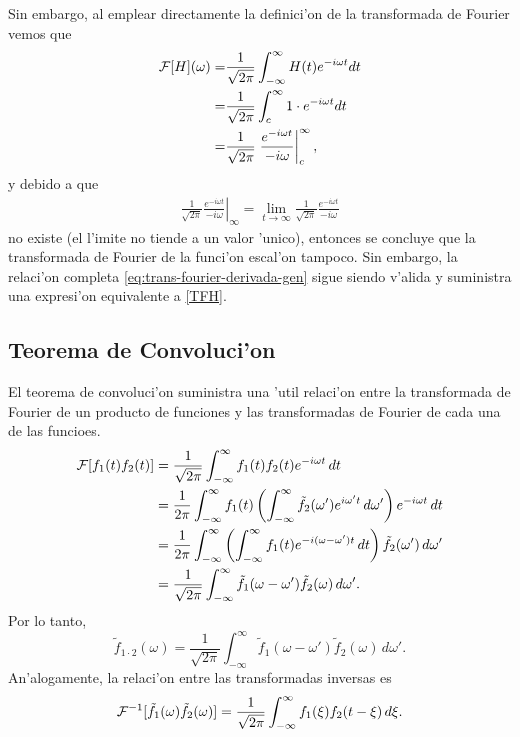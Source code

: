 Sin embargo, al emplear directamente la definici'on de la transformada de Fourier vemos que
\begin{align}
{\cal F}[H](\omega)=&\frac{1}{\sqrt{2\pi}}\int_{-\infty}^{\infty}H(t)e^{-i\omega t}dt\notag \\
=&\frac{1}{\sqrt{2\pi}}\int_{c}^{\infty}1\cdot e^{-i\omega t}dt\notag \\
=&\frac{1}{\sqrt{2\pi}}\left.\frac{e^{-i\omega t}}{-i\omega}\right|_{c}^{\infty}, \label{TFH}
\end{align}
y debido a que
\begin{align}
\frac{1}{\sqrt{2\pi}}\left.\frac{e^{-i\omega t}}{-i\omega}\right|_{\infty}=\lim_{t \rightarrow \infty} \frac{1}{\sqrt{2\pi}}\frac{e^{-i\omega t}}{-i\omega}
\end{align}
no existe (el l'imite no tiende a un valor 'unico), entonces se concluye que la transformada de Fourier de la funci'on escal'on tampoco. Sin embargo, la relaci'on  completa \eqref{eq:trans-fourier-derivada-gen} sigue siendo v'alida y suministra una expresi'on equivalente a \eqref{TFH}.
%
\subsection{Teorema de Convoluci'on}
El teorema de convoluci'on suministra una 'util relaci'on entre la transformada de Fourier de un producto de funciones y las transformadas de Fourier de cada una de las funcioes.
\begin{align}
{\cal F}[f_1(t)f_2(t)]
 &=\frac{1}{\sqrt{2\pi}}\int_{-\infty}^\infty f_1(t)f_2(t) e^{-i\omega t}\,dt \\
 &=\frac{1}{2\pi}\int_{-\infty}^\infty f_1(t) \left(\int_{-\infty}^\infty\tilde{f}_2(\omega')
 e^{i\omega' t}\,d\omega'\right)e^{-i\omega t}\,dt \\
 &=\frac{1}{2\pi}\int_{-\infty}^\infty\left(\int_{-\infty}^\infty f_1(t) 
 e^{-i(\omega-\omega')t}\,dt\right)\tilde{f}_2(\omega')\,d\omega' \\
 &=\frac{1}{\sqrt{2\pi}} \int_{-\infty}^\infty\tilde{f}_1(\omega-\omega')\tilde{f}_2(\omega)\,d\omega'.
\end{align}
Por lo tanto, 
\begin{equation}
\boxed{ \tilde{f}_{1\cdot 2}(\omega)=\frac{1}{\sqrt{2\pi}} \int_{-\infty}^\infty\tilde{f}_1(\omega-\omega')\tilde{f}_2(\omega)\,d\omega' .
 } 
\end{equation}   
An'alogamente, la relaci'on entre las transformadas inversas es
\begin{equation}
{\cal F}^{-1}[\tilde{f}_1(\omega)\tilde{f}_2(\omega)]
=\frac{1}{\sqrt{2\pi}}\int_{-\infty}^\infty f_1(\xi)f_2(t-\xi)\,d\xi .	
\end{equation}

